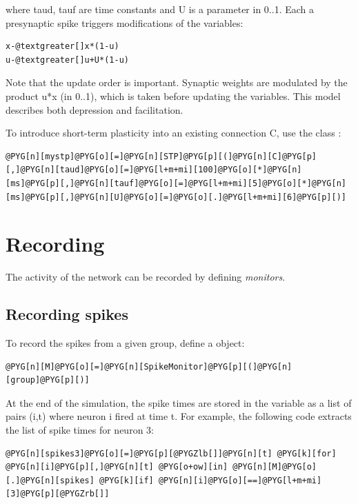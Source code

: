 \documentclass[letterpaper,10pt,english]{manual}
\begin{document}
where taud, tauf are time constants and U is a parameter in 0..1.
Each a presynaptic spike triggers modifications of the variables:

\begin{Verbatim}[commandchars=@\[\]]
x-@textgreater[]x*(1-u)
u-@textgreater[]u+U*(1-u)
\end{Verbatim}

Note that the update order is important.
Synaptic weights are modulated by the product u*x (in 0..1), which is taken
before updating the variables. This model describes both depression and
facilitation.

To introduce short-term plasticity into an existing connection C, use the class
\hyperlink{brian.STP}{}:

\begin{Verbatim}[commandchars=@\[\]]
@PYG[n][mystp]@PYG[o][=]@PYG[n][STP]@PYG[p][(]@PYG[n][C]@PYG[p][,]@PYG[n][taud]@PYG[o][=]@PYG[l+m+mi][100]@PYG[o][*]@PYG[n][ms]@PYG[p][,]@PYG[n][tauf]@PYG[o][=]@PYG[l+m+mi][5]@PYG[o][*]@PYG[n][ms]@PYG[p][,]@PYG[n][U]@PYG[o][=]@PYG[o][.]@PYG[l+m+mi][6]@PYG[p][)]
\end{Verbatim}

\resetcurrentobjects
\hypertarget{--doc-recording}{}

\section{Recording}

The activity of the network can be recorded by defining \emph{monitors}.


\subsection{Recording spikes}

To record the spikes from a given group, define a \hyperlink{brian.SpikeMonitor}{} object:

\begin{Verbatim}[commandchars=@\[\]]
@PYG[n][M]@PYG[o][=]@PYG[n][SpikeMonitor]@PYG[p][(]@PYG[n][group]@PYG[p][)]
\end{Verbatim}

At the end of the simulation, the spike times are stored in the variable  as
a list of pairs (i,t) where neuron i fired at time t. For example, the following code extracts
the list of spike times for neuron 3:

\begin{Verbatim}[commandchars=@\[\]]
@PYG[n][spikes3]@PYG[o][=]@PYG[p][@PYGZlb[]]@PYG[n][t] @PYG[k][for] @PYG[n][i]@PYG[p][,]@PYG[n][t] @PYG[o+ow][in] @PYG[n][M]@PYG[o][.]@PYG[n][spikes] @PYG[k][if] @PYG[n][i]@PYG[o][==]@PYG[l+m+mi][3]@PYG[p][@PYGZrb[]]
\end{Verbatim}
\end{document}
